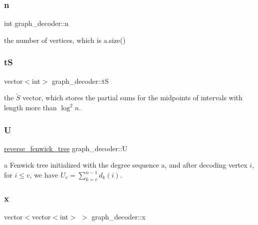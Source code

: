 \subsubsection{\texorpdfstring{n}{n}}
{\footnotesize\ttfamily int graph\+\_\+decoder\+::n\hspace{0.3cm}{\ttfamily [private]}}



the number of vertices, which is a.\+size() 

\mbox{\label{classgraph__decoder_ac466636b9b21122f4fa0246aa624978c}} 
\subsubsection{\texorpdfstring{tS}{tS}}
{\footnotesize\ttfamily vector$<$int$>$ graph\+\_\+decoder\+::tS\hspace{0.3cm}{\ttfamily [private]}}



the $\tilde{S}$ vector, which stores the partial sums for the midpoints of intervals with length more than $\log^2 n$. 

\mbox{\label{classgraph__decoder_a2fa9fec2cef06aaa410e57fb59d5c1ad}} 
\subsubsection{\texorpdfstring{U}{U}}
{\footnotesize\ttfamily \hyperlink{classreverse__fenwick__tree}{reverse\+\_\+fenwick\+\_\+tree} graph\+\_\+decoder\+::U\hspace{0.3cm}{\ttfamily [private]}}



a Fenwick tree initialized with the degree sequence a, and after decoding vertex $i$, for $i \leq v$, we have $U_v = \sum_{k=v}^{n-1} d_k(i)$. 

\mbox{\label{classgraph__decoder_aa3f2776afe387668cf7f68109428e14e}} 
\subsubsection{\texorpdfstring{x}{x}}
{\footnotesize\ttfamily vector$<$vector$<$int$>$ $>$ graph\+\_\+decoder\+::x\hspace{0.3cm}{\ttfamily [private]}}



